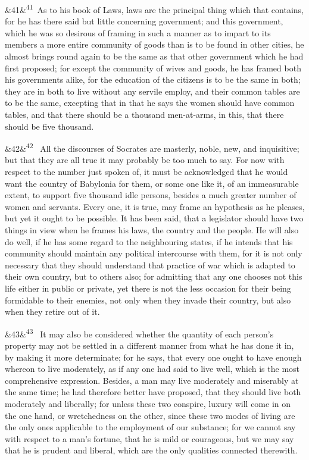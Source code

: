 \documentclass[12pt]{article}
\newcommand{\para}[1][]{\par\noindent\ifx&#1&\else\textsuperscript{\footnotesize #1}~\fi}
\begin{document}
\para[41] [1265a] As to his book of Laws, laws are the principal thing which that contains, for he has there said but little concerning government; and this government, which he was so desirous of framing in such a manner as to impart to its members a more entire community of goods than is to be found in other cities, he almost brings round again to be the same as that other government which he had first proposed; for except the community of wives and goods, he has framed both his governments alike, for the education of the citizens is to be the same in both; they are in both to live without any servile employ, and their common tables are to be the same, excepting that in that he says the women should have common tables, and that there should be a thousand men-at-arms, in this, that there should be five thousand.

\para[42] All the discourses of Socrates are masterly, noble, new, and inquisitive; but that they are all true it may probably be too much to say. For now with respect to the number just spoken of, it must be acknowledged that he would want the country of Babylonia for them, or some one like it, of an immeasurable extent, to support five thousand idle persons, besides a much greater number of women and servants. Every one, it is true, may frame an hypothesis as he pleases, but yet it ought to be possible. It has been said, that a legislator should have two things in view when he frames his laws, the country and the people. He will also do well, if he has some regard to the neighbouring states, if he intends that his community should maintain any political intercourse with them, for it is not only necessary that they should understand that practice of war which is adapted to their own country, but to others also; for admitting that any one chooses not this life either in public or private, yet there is not the less occasion for their being formidable to their enemies, not only when they invade their country, but also when they retire out of it.

\para[43] It may also be considered whether the quantity of each person's property may not be settled in a different manner from what he has done it in, by making it more determinate; for he says, that every one ought to have enough whereon to live moderately, as if any one had said to live well, which is the most comprehensive expression. Besides, a man may live moderately and miserably at the same time; he had therefore better have proposed, that they should live both moderately and liberally; for unless these two conspire, luxury will come in on the one hand, or wretchedness on the other, since these two modes of living are the only ones applicable to the employment of our substance; for we cannot say with respect to a man's fortune, that he is mild or courageous, but we may say that he is prudent and liberal, which are the only qualities connected therewith.
\end{document}
